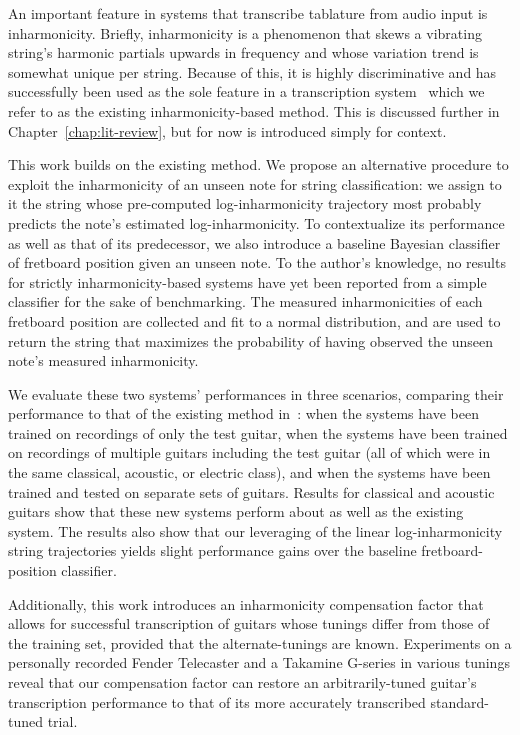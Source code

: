 \documentclass[12pt]{cmuthesis}
\begin{document}
An important feature in systems that transcribe tablature from audio input is inharmonicity. Briefly, inharmonicity is a phenomenon that skews a vibrating string's harmonic partials upwards in frequency and whose variation trend is somewhat unique per string. Because of this, it is highly discriminative and has successfully been used as the sole feature in a transcription system~\cite{barbanchoi2012} which we refer to as the existing inharmonicity-based method. This is discussed further in Chapter~\ref{chap:lit-review}, but for now is introduced simply for context.

This work builds on the existing method. We propose an alternative procedure to exploit the inharmonicity of an unseen note for string classification: we assign to it the string whose pre-computed log-inharmonicity trajectory most probably predicts the note's estimated log-inharmonicity. To contextualize its performance as well as that of its predecessor, we also introduce a baseline Bayesian classifier of fretboard position given an unseen note. To the author's knowledge, no results for strictly inharmonicity-based systems have yet been reported from a simple classifier for the sake of benchmarking. The measured inharmonicities of each fretboard position are collected and fit to a normal distribution, and are used to return the string that maximizes the probability of having observed the unseen note's measured inharmonicity.

We evaluate these two systems' performances in three scenarios, comparing their performance to that of the existing method in~\cite{barbanchoi2012}: when the systems have been trained on recordings of only the test guitar, when the systems have been trained on recordings of multiple guitars including the test guitar (all of which were in the same classical, acoustic, or electric class), and when the systems have been trained and tested on separate sets of guitars. Results for classical and acoustic guitars show that these new systems perform about as well as the existing system. The results also show that our leveraging of the linear log-inharmonicity string trajectories yields slight performance gains over the baseline fretboard-position classifier.

Additionally, this work introduces an inharmonicity compensation factor that allows for successful transcription of guitars whose tunings differ from those of the training set, provided that the alternate-tunings are known. Experiments on a personally recorded Fender Telecaster and a Takamine G-series in various tunings reveal that our compensation factor can restore an arbitrarily-tuned guitar's transcription performance to that of its more accurately transcribed standard-tuned trial.
\end{document}
